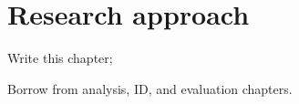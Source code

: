 \chapter{Research approach}

\begin{todo}
\item Write this chapter;
\item Borrow from analysis, ID, and evaluation chapters.
\end{todo}

\nlipsum
